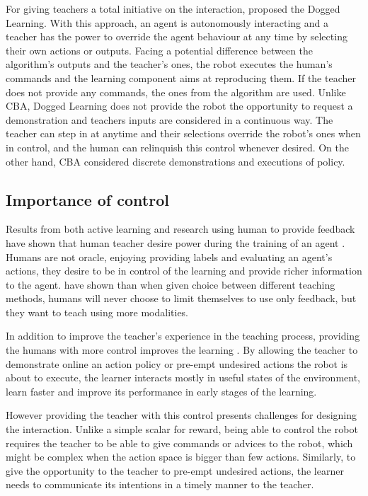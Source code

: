 For giving teachers a total initiative on the interaction, \cite{grollman2007dogged} proposed the Dogged Learning. With this approach, an agent is autonomously interacting and a teacher has the power to override the agent behaviour at any time by selecting their own actions or outputs. Facing a potential difference between the algorithm's outputs and the teacher's ones, the robot executes the human's commands and the learning component aims at reproducing them. If the teacher does not provide any commands, the ones from the algorithm are used. Unlike CBA, Dogged Learning does not provide the robot the opportunity to request a demonstration and teachers inputs are considered in a continuous way. The teacher can step in at anytime and their selections override the robot's ones when in control, and the human can relinquish this control whenever desired. On the other hand, CBA considered discrete demonstrations and executions of policy.

\subsection{Importance of control}

Results from both active learning and research using human to provide feedback have shown that human teacher desire power during the training of an agent \citep{amershi2014power}. Humans are not oracle, enjoying providing labels and evaluating an agent's actions, they desire to be in control of the learning and provide richer information to the agent. \cite{kaochar2011towards} have shown than when given choice between different teaching methods, humans will never choose to limit themselves to use only feedback, but they want to teach using more modalities.

In addition to improve the teacher's experience in the teaching process, providing the humans with more control improves the learning \citep{thomaz2008teachable}. By allowing the teacher to demonstrate online an action policy or pre-empt undesired actions the robot is about to execute, the learner interacts mostly in useful states of the environment, learn faster and improve its performance in early stages of the learning.

However providing the teacher with this control presents challenges for designing the interaction. Unlike a simple scalar for reward, being able to control the robot requires the teacher to be able to give commands or advices to the robot,  which might be complex when the action space is bigger than few actions. Similarly, to give the opportunity to the teacher to pre-empt undesired actions, the learner needs to communicate its intentions in a timely manner to the teacher. %

